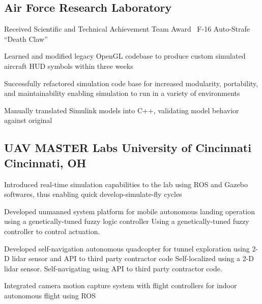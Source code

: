 \documentclass[letterpaper]{deedy-resume}
\newcommand{\experiencespace}{\vspace{2ex}}
\begin{document}
\begin{minipage}[t]{0.70\textwidth}
    \subsection{Air Force Research Laboratory}
    \begin{compactitem}
        \item Received Scientific and Technical Achievement Team Award \textemdash\ F-16 Auto-Strafe ``Death
            Claw''
        \item Learned and modified legacy OpenGL codebase to produce custom simulated aircraft HUD symbols
            within three weeks
        \item Successfully refactored simulation code base for increased modularity, portability, and
            maintainability enabling simulation to run in a variety of environments
        \item Manually translated Simulink models into C++, validating model behavior against original
    \end{compactitem}

    \subsection{UAV MASTER Labs \textendash{} University of Cincinnati \hfill Cincinnati, OH}
    \begin{compactitem}
        \item Introduced real-time simulation capabilities to the lab using ROS and Gazebo softwares, thus
            enabling quick develop-simulate-fly cycles
        \item Developed unmanned system platform for mobile autonomous landing operation using a
            genetically-tuned fuzzy logic controller
            \subitem Using a genetically-tuned fuzzy controller to control actuation.
        \item Developed self-navigation autonomous quadcopter for tunnel exploration using 2-D lidar sensor
            and API to third party contractor code
            \subitem Self-localized using a 2-D lidar sensor.
            \subitem Self-navigating using API to third party contractor code.
        \item Integrated camera motion capture system with flight controllers for indoor autonomous flight
            using ROS
    \end{compactitem}
    \experiencespace
    

\end{minipage}
\end{document}

